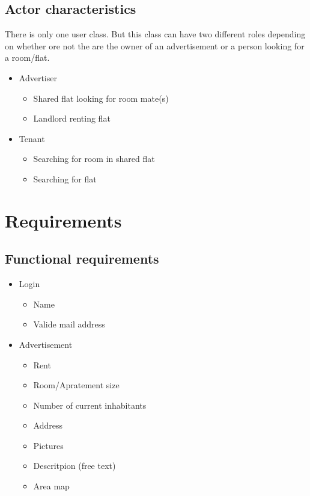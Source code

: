 \documentclass[a4paper,11pt]{article}
\begin{document}
\subsection*{Actor characteristics}
There is only one user class. But this class can have two different roles depending on whether ore not the are the owner of an advertisement or a person looking for a room/flat.
\begin{itemize}
  \item Advertiser
    \begin{itemize}
      \item Shared flat looking for room mate(s)
      \item Landlord renting flat
    \end{itemize}
  \item Tenant
  \begin{itemize}
    \item Searching for room in shared flat
    \item Searching for flat
  \end{itemize}
\end{itemize}

\section{Requirements}
\subsection*{Functional requirements}
\begin{itemize}
  \item Login
  \begin{itemize}
    \item Name
    \item Valide mail address
  \end{itemize}
  \item Advertisement
  \begin{itemize}
    \item Rent
    \item Room/Apratement size
    \item Number of current inhabitants
    \item Address
    \item Pictures
    \item Descritpion (free text)
    \item Area map
  \end{itemize}
\end{itemize}
\end{document}

